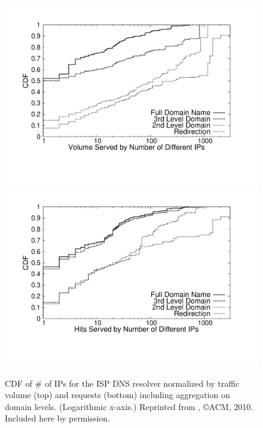 \begin{figure}[htbp]
  \center
   \includegraphics[height=0.7\linewidth]{figures-pdf/14day-returnedIPCDF-bytes}
   \includegraphics[height=0.7\linewidth]{figures-pdf/14day-returnedIPCDF-hits}
  \caption{CDF of \# of IPs for the ISP DNS resolver normalized by traffic
    volume  (top) and requests (bottom) including aggregation on
    domain levels. (Logarithmic x-axis.) Reprinted from \cite{PADIS2010}, \copyright ACM, 2010. Included here by permission.}
  \label{fig:CDF-IPPAF-IPs}
\end{figure}

